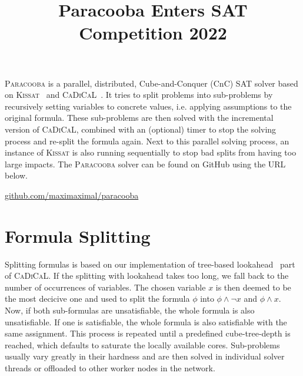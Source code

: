 \documentclass[conference]{IEEEtran}
\newcommand{\paracooba}{\textsc{Paracooba}}
\newcommand{\kissat}{\textsc{Kissat}}
\newcommand{\cadical}{\textsc{CaDiCaL}}
\begin{document}
\title{Paracooba Enters SAT Competition 2022}

\author{
}

\maketitle

\paracooba{} is a parallel, distributed, Cube-and-Conquer (CnC) SAT solver based on
\kissat{}~\cite{kissatsat2020} and \cadical~\cite{cadical}. It tries to split problems into
sub-problems by recursively setting variables to concrete values, i.e. applying assumptions to the
original formula. These sub-problems are then solved with the incremental version of \cadical{},
combined with an (optional) timer to stop the solving process and re-split the formula again. Next
to this parallel solving process, an instance of \kissat{} is also running sequentially to stop bad
splits from having too large impacts. The \paracooba{} solver can be found on GitHub using the URL
below.

\begin{center}
\href{https://github.com/maximaximal/paracooba}{github.com/maximaximal/paracooba}
\end{center}

\section{Formula Splitting}

Splitting formulas is based on our implementation of tree-based lookahead~\cite{treelook} part of
\cadical{}. If the splitting with lookahead takes too long, we fall back to the number of
occurrences of variables. The chosen variable $x$ is then deemed to be the most decicive one and
used to split the formula $\phi$ into $\phi \wedge \neg x$ and $\phi \wedge x$. Now, if both
sub-formulas are unsatisfiable, the whole formula is also unsatisfiable. If one is satisfiable, the
whole formula is also satisfiable with the same assignment. This process is repeated until a
predefined cube-tree-depth is reached, which defaults to saturate the locally
available cores.
Sub-problems usually vary greatly in their hardness and are then solved in individual
solver threads or offloaded to other worker nodes in the network.
\end{document}
